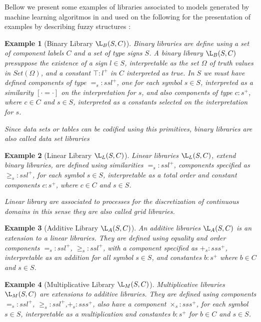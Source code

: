 \documentclass[oribibl]{llncs}
\newtheorem{exam}{Example}
\begin{document}
Bellow we present some examples of libraries associated to models generated by machine learning algoritmos in \cite{Michell86} and used on the following for the presentation of examples by describing fuzzy structures :
\begin{exam}[Binary Library $\L_B(S,C)$]\label{binarylibrary}
Binary libraries are define using a set of component labels $C$ and a set of type signs $S$. A binary library $\L_B(S,C)$ presuppose the existence of a sign $l\in S$, interpretable as the set $\Omega$ of truth values in $Set(\Omega)$, and a
constant $\top:l^+$ in $C$ interpreted as true. In $S$ we must have  defined  components of type $=_s:ssl^+$, one for each symbol $s\in S$, interpreted as a
similarity $[\cdot=\cdot]$ on the interpretation for $s$, and also components of type $c:s^+$, where $c\in C$ and $s\in S$, interpreted as a constants selected on the interpretation for $s$.

Since data sets or tables can be codified using this primitives, binary libraries are also called data set libraries
\end{exam}

\begin{exam}[Linear Library $\L_L(S,C)$]\label{linearlibrary}
Linear libraries $\L_L(S,C)$, extend binary libraries, are defined
using similarities $=_s:ssl^+$, components specified as
$\geq_s:ssl^+$, for each symbol $s\in S$, interpretable as a total order
and constant components $c:s^+$, where $c\in C$ and $s\in S$.

Linear library are associated to processes for the discretization of continuous domains in this sense they are also called grid libraries.
\end{exam}

\begin{exam}[Additive Library $\L_A(S,C)$]\label{addlibrary}
An additive libraries $\L_A(S,C)$ is an extension to a linear libraries. They are defined
using equality and order components $=_s:ssl^+$, $\geq_s:ssl^+$,
with a component specified as $+_s:sss^+$, interpretable as an
addition for all symbol $s\in S$, and constantes $b:s^+$ where $b\in
C$ and $s\in S$.
\end{exam}

\begin{exam}[Multiplicative Library $\L_M(S,C)$]\label{multlibary}
Multiplicative libraries $\L_M(S,C)$ are extensions to additive libraries. They are
defined using components $=_s:ssl^+$, $\geq_s:ssl^+$,$+_s:sss^+$,
also have a component $\times_s:sss^+$, for each symbol $s\in S$,
interpretable as a multiplication and constantes $b:s^+$ for $b\in C$ and $s\in
S$.
\end{exam}
\end{document}
